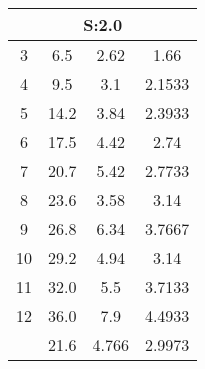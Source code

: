 
	\begin{table}[H]
		\begin{tabular}{c|ccc}
			\multicolumn{4}{c}{S:2.0}\\\hline
			3 & 6.5 & 2.62 & 1.66\\
			4 & 9.5 & 3.1 & 2.1533\\
			5 & 14.2 & 3.84 & 2.3933\\
			6 & 17.5 & 4.42 & 2.74\\
			7 & 20.7 & 5.42 & 2.7733\\
			8 & 23.6 & 3.58 & 3.14\\
			9 & 26.8 & 6.34 & 3.7667\\
			10 & 29.2 & 4.94 & 3.14\\
			11 & 32.0 & 5.5 & 3.7133\\
			12 & 36.0 & 7.9 & 4.4933\\
			\hline
			& 21.6 & 4.766 & 2.9973\\
		\end{tabular}
	\end{table}
	
